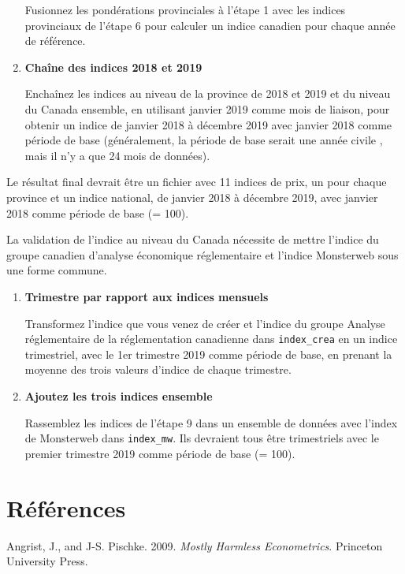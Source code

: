 \documentclass[]{article}
\begin{document}
\begin{enumerate}
  Fusionnez les pondérations provinciales à l'étape 1 avec les indices provinciaux de l'étape 6 pour calculer un indice canadien pour chaque année de référence.
\item
  \textbf{Chaîne des indices 2018 et 2019}

  Enchaînez les indices au niveau de la province de 2018 et 2019 et du niveau du Canada ensemble, en utilisant janvier 2019 comme mois de liaison, pour obtenir un indice de janvier 2018 à décembre 2019 avec janvier 2018 comme période de base (généralement, la période de base serait une année civile , mais il n'y a que 24 mois de données).
\end{enumerate}

Le résultat final devrait être un fichier avec 11 indices de prix, un pour chaque province et un indice national, de janvier 2018 à décembre 2019, avec janvier 2018 comme période de base (= 100).

La validation de l'indice au niveau du Canada nécessite de mettre l'indice du groupe canadien d'analyse économique réglementaire et l'indice Monsterweb sous une forme commune.

\begin{enumerate}
\def\labelenumi{\arabic{enumi}.}
\setcounter{enumi}{8}
\item
  \textbf{Trimestre par rapport aux indices mensuels}

  Transformez l'indice que vous venez de créer et l'indice du groupe Analyse réglementaire de la réglementation canadienne dans \texttt{index\_crea} en un indice trimestriel, avec le 1er trimestre 2019 comme période de base, en prenant la moyenne des trois valeurs d'indice de chaque trimestre.
\item
  \textbf{Ajoutez les trois indices ensemble}

  Rassemblez les indices de l'étape 9 dans un ensemble de données avec l'index de Monsterweb dans \texttt{index\_mw}. Ils devraient tous être trimestriels avec le premier trimestre 2019 comme période de base (= 100).
\end{enumerate}

\hypertarget{ruxe9fuxe9rences}{%
\section*{Références}\label{ruxe9fuxe9rences}}

\hypertarget{refs}{}
\leavevmode\hypertarget{ref-angrist2009}{}%
Angrist, J., and J-S. Pischke. 2009. \emph{Mostly Harmless Econometrics}. Princeton University Press.
\end{document}
